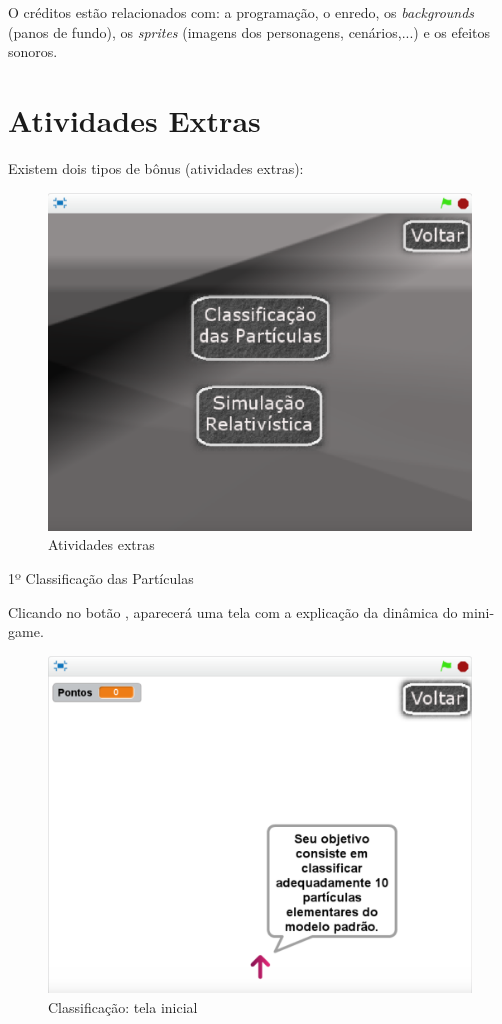 \documentclass[12pt,fleqn]{book} %
\begin{document}
O créditos estão relacionados com: a programação, o enredo, os \textit{backgrounds} (panos de fundo), os \textit{sprites} (imagens dos personagens, cenários,...) e os efeitos sonoros.

\newpage

\section{Atividades Extras}
Existem dois tipos de bônus (atividades extras):

\begin{figure}[h]
	\centering
	\includegraphics[width=0.65 \textwidth]{Produto/extras}
	\caption{Atividades extras}
	\label{fig:app_a:extras}
\end{figure}


1º Classificação das Partículas

Clicando no botão , aparecerá uma tela com a explicação da dinâmica do mini-game.

\begin{figure}[h]
	\centering
	\includegraphics[width=0.65 \textwidth]{Produto/class1}
	\caption{Classificação: tela inicial}
	\label{fig:app_a:class1}
\end{figure}
\end{document}
